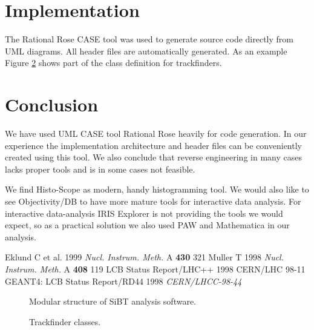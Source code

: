 \documentclass{hep99}
\begin{document}
\section{Implementation\label{sec:implementation}}
The Rational Rose CASE tool was used to generate source code directly
from UML diagrams. All header files are automatically generated. 
As an example Figure \ref{fig:finder} shows part of 
the class definition for trackfinders.

\section{Conclusion\label{sec:conclusion}}
We have used UML CASE tool Rational Rose heavily for code
generation. In our experience the implementation architecture and header
files can be conveniently created using this tool. 
We also conclude that reverse engineering in many cases lacks proper
tools and is in some cases not feasible. 

We find Histo-Scope as modern, handy histogramming tool.
We would also like to see
Objectivity/DB to have more mature tools for interactive data
analysis. For interactive data-analysis IRIS Explorer is not
providing the tools we would expect, so as a practical solution
we also used PAW and Mathematica in our analysis.

\begin{thebibliography}{9}
 Eklund C et al. 1999 {\it Nucl. Instrum. Meth.} A {\bf
430} 321
 Muller T 1998 {\it Nucl. Instrum. Meth.} A {\bf 408} 119
 LCB Status Report/LHC++ 1998 {CERN/LHC 98-11}
 GEANT4: LCB Status Report/RD44 1998 {\it CERN/LHCC-98-44} 

\end{thebibliography}


\begin{figure}
\begin{center}
\end{center}
\caption{Modular structure of SiBT analysis software.}
\label{fig:uml}
\end{figure}



\begin{figure}
\begin{center}
\end{center}
\caption{Trackfinder classes.}
\label{fig:finder}
\end{figure}
\end{document}
